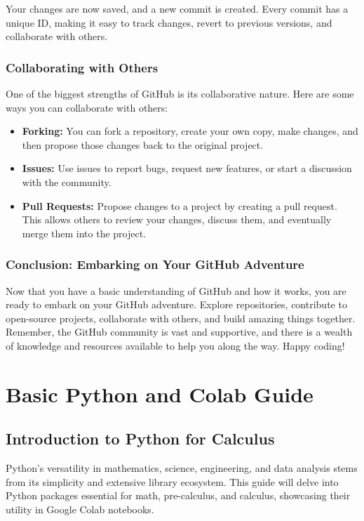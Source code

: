 \documentclass[a4paper,12pt]{book}
\begin{document}
Your changes are now saved, and a new commit is created. Every commit has a unique ID, making it easy to track changes, revert to previous versions, and collaborate with others.

\subsection*{Collaborating with Others}

One of the biggest strengths of GitHub is its collaborative nature. Here are some ways you can collaborate with others:

\begin{itemize}
    \item \textbf{Forking:} You can fork a repository, create your own copy, make changes, and then propose those changes back to the original project.
    \item \textbf{Issues:} Use issues to report bugs, request new features, or start a discussion with the community.
    \item \textbf{Pull Requests:} Propose changes to a project by creating a pull request. This allows others to review your changes, discuss them, and eventually merge them into the project.
\end{itemize}

\subsection*{Conclusion: Embarking on Your GitHub Adventure}

Now that you have a basic understanding of GitHub and how it works, you are ready to embark on your GitHub adventure. Explore repositories, contribute to open-source projects, collaborate with others, and build amazing things together. Remember, the GitHub community is vast and supportive, and there is a wealth of knowledge and resources available to help you along the way. Happy coding!

\chapter{Basic Python and Colab Guide}
\section*{Introduction to Python for Calculus}

Python's versatility in mathematics, science, engineering, and data analysis stems from its simplicity and extensive library ecosystem. This guide will delve into Python packages essential for math, pre-calculus, and calculus, showcasing their utility in Google Colab notebooks.
\end{document}
